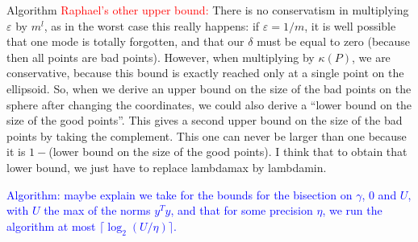 \begin{subsection}{Algorithm}
\textcolor{red}{Raphael's other upper bound:} 
There is no conservatism in multiplying $\varepsilon$ by $m^l$, as in the worst case this really happens: if $\varepsilon = 1/m$, it is well possible that one mode is totally forgotten, and that our $\delta$ must be equal to zero (because then all points are bad points). However, when multiplying by $\kappa(P)$, we are conservative, because this bound is exactly reached only at a single point on the ellipsoid.
So, when we derive an upper bound on the size of the bad points on the sphere after changing the coordinates, we could also derive a ``lower bound on the size of the good points''. This gives a second upper bound on the size of the bad points by taking the complement.  This one can never be larger than one because it is $1-$(lower bound on the size of the good points). I think that to obtain that lower bound, we just have to replace lambdamax by lambdamin.

\textcolor{blue}{Algorithm: maybe explain we take for the bounds for the bisection on $\gamma$, $0$ and $U$, with $U$ the max of the norms $y^T y$, and that for some precision $\eta$, we run the algorithm at most $\lceil \log_2(U/\eta) \rceil$.}

\end{subsection}



